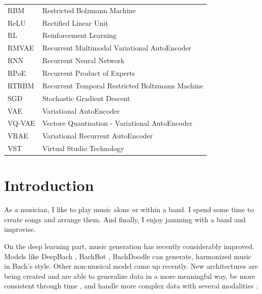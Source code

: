 \documentclass[12pt]{report}
\begin{document}
\begin{center}
\begin{longtable}{ll}
        RBM & Restricted Bolzmann Machine \\
        ReLU & Rectified Linear Unit \\
        RL & Reinforcement Learning \\
        RMVAE & Recurrent Multimodal Variational AutoEncoder \\
        RNN & Recurrent Neural Network \\
        RPoE & Recurrent Product of Experts \\
        RTRBM & Recurrent Temporal Restricted Boltzmann Machine \\
        SGD & Stochastic Gradient Descent \\
        VAE & Variational AutoEncoder \\
        VQ-VAE & Vectore Quantisation - Variational AutoEncoder \\
        VRAE & Variational Recurrent AutoEncoder \\
        VST & Virtual Studio Technology
    \end{longtable}
    
\end{center}
\newpage




\chapter{Introduction}

As a musician, I like to play music alone or within a band.
I spend some time to create songs and arrange them. And finally, I enjoy jamming with a band and improvise.

On the deep learning part, music generation has recently considerably improved.
Models like DeepBach \cite{hadjeres_deepbach:_2016}, BachBot \cite{liang_automatic_2017}, BachDoodle \cite{huang_bach_2019} can generate, harmonized music in Bach's style.
Other non-musical model came up recently.
New architectures are being created and are able to generalize data in a more meaningful way, be more consistent through time \cite{vaswani_attention_2017}, and handle more complex data with several modalities \cite{wu_multimodal_2018-1, tan_factorized_2019}.
\end{document}
